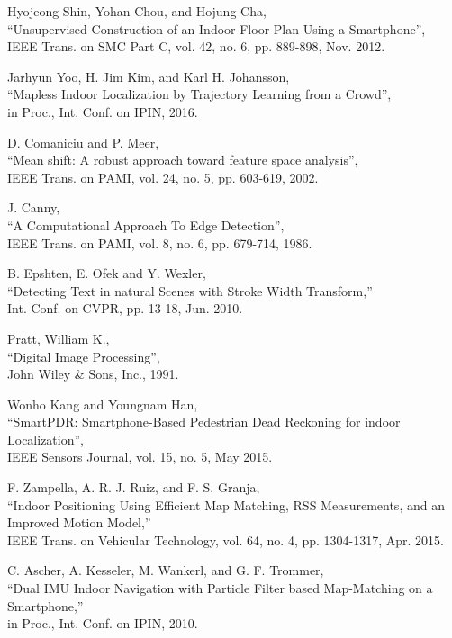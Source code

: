 \begin{thebibliography}{99}
Hyojeong Shin, Yohan Chou, and Hojung Cha, \\
``Unsupervised Construction of an Indoor Floor Plan Using a Smartphone'',\\
IEEE Trans. on SMC Part C, vol. 42, no. 6, pp. 889-898, Nov. 2012.

Jarhyun Yoo, H. Jim Kim, and Karl H. Johansson,\\
``Mapless Indoor Localization by Trajectory Learning from a Crowd'',\\
in Proc., Int. Conf. on IPIN, 2016.

D. Comaniciu and P. Meer, \\
``Mean shift: A robust approach toward feature space analysis'', \\
IEEE Trans. on PAMI, vol. 24, no. 5, pp. 603-619, 2002.

J. Canny, \\
``A Computational Approach To Edge Detection'', \\
IEEE Trans. on PAMI, vol. 8, no. 6, pp. 679-714, 1986.

B. Epshten, E. Ofek and Y. Wexler,\\
``Detecting Text in natural Scenes with Stroke Width Transform,'' \\
Int. Conf. on CVPR, pp. 13-18, Jun. 2010.

Pratt, William K.,\\
``Digital Image Processing'',\\
John Wiley \& Sons, Inc., 1991.

Wonho Kang and Youngnam Han, \\
``SmartPDR: Smartphone-Based Pedestrian Dead Reckoning for indoor Localization'', \\
IEEE Sensors Journal, vol. 15, no. 5, May 2015.

F. Zampella, A. R. J. Ruiz, and F. S. Granja, \\
``Indoor Positioning Using Efficient Map Matching, RSS Measurements, and an Improved Motion Model,'' \\
IEEE Trans. on Vehicular Technology, vol. 64, no. 4, pp. 1304-1317, Apr. 2015.

C. Ascher, A. Kesseler, M. Wankerl, and G. F. Trommer, \\
``Dual IMU Indoor Navigation with Particle Filter based Map-Matching on a Smartphone,''\\
in Proc., Int. Conf. on IPIN, 2010.


\end{thebibliography}
